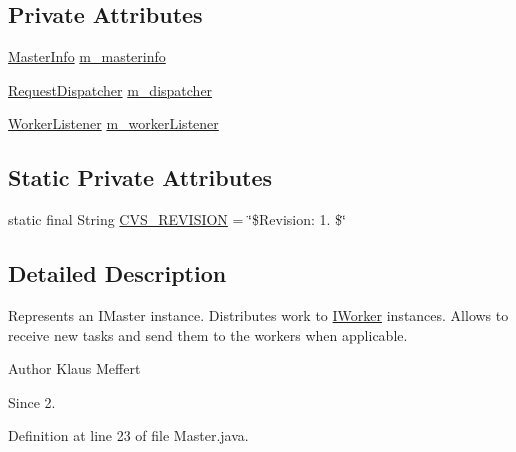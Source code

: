 \subsection*{Private Attributes}
\begin{DoxyCompactItemize}
\item 
\hyperlink{classorg_1_1jgap_1_1distr_1_1_master_info}{Master\-Info} \hyperlink{classorg_1_1jgap_1_1distr_1_1_master_a999e12d2e748c75f91855f170c01103a}{m\-\_\-masterinfo}
\item 
\hyperlink{classorg_1_1jgap_1_1distr_1_1_request_dispatcher}{Request\-Dispatcher} \hyperlink{classorg_1_1jgap_1_1distr_1_1_master_a48a34300a87d49418097404501a7b7b7}{m\-\_\-dispatcher}
\item 
\hyperlink{classorg_1_1jgap_1_1distr_1_1_worker_listener}{Worker\-Listener} \hyperlink{classorg_1_1jgap_1_1distr_1_1_master_acc6cd5d74b76faad8aa60322f8333f89}{m\-\_\-worker\-Listener}
\end{DoxyCompactItemize}
\subsection*{Static Private Attributes}
\begin{DoxyCompactItemize}
\item 
static final String \hyperlink{classorg_1_1jgap_1_1distr_1_1_master_ac30d904aa530e2e5f61629c3c93d82ce}{C\-V\-S\-\_\-\-R\-E\-V\-I\-S\-I\-O\-N} = \char`\"{}\$Revision\-: 1. \$\char`\"{}
\end{DoxyCompactItemize}


\subsection{Detailed Description}
Represents an I\-Master instance. Distributes work to \hyperlink{interfaceorg_1_1jgap_1_1distr_1_1_i_worker}{I\-Worker} instances. Allows to receive new tasks and send them to the workers when applicable.

\begin{DoxyAuthor}{Author}
Klaus Meffert 
\end{DoxyAuthor}
\begin{DoxySince}{Since}
2. 
\end{DoxySince}


Definition at line 23 of file Master.\-java.



